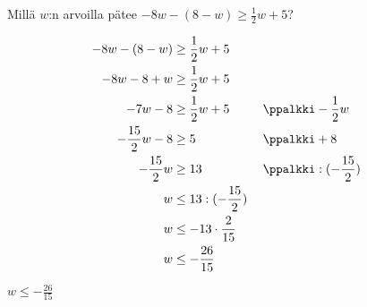 
\begin{esimerkki} Millä $w$:n arvoilla pätee
$-8w-(8-w) \geq \frac12 w+5$?
\begin{esimratk}
\begin{align*}
-8w-(8-w) &\geq \frac12 w+5 \\
-8w-8+w &\geq \frac12 w+5 \\
-7w-8 &\geq \frac12 w+5  \ \ \ \ \ && \ppalkki -\frac12 w \\
-\frac{15}{2} w-8 &\geq 5  \ \ \ \ \ && \ppalkki +8 \\
-\frac{15}{2} w &\geq 13  \ \ \ \ \ && \ppalkki :(-\frac{15}{2}) \\
w &\leq 13:(-\frac{15}{2}) \\
w &\leq -13\cdot \frac{2}{15} \\
w &\leq -\frac{26}{15} \\
\end{align*}
\end{esimratk}
\begin{esimvast}
$w \leq -\frac{26}{15}$
\end{esimvast}
\end{esimerkki}

